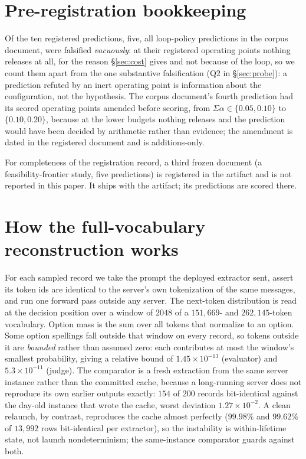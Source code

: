 \documentclass{article}
\newif\ifclaimtags\claimtagsfalse
\newcommand{\ct}[1]{\ifclaimtags\hfill{\scriptsize\textcolor{gray}{[#1]}}\fi}
\begin{document}
\section{Pre-registration bookkeeping}\label{app:prereg}
Of the ten registered predictions, five, all loop-policy predictions in the corpus document, were falsified \emph{vacuously}: at their registered operating points
nothing releases at all, for the reason \S\ref{sec:cost} gives and not because of
the loop, so we count them apart from the one substantive falsification (Q2 in \S\ref{sec:probe}): a prediction refuted by an inert operating point is
information about the configuration, not the hypothesis. The corpus document's fourth prediction had its scored operating points amended before
scoring, from $\Sigma\alpha \in \{0.05, 0.10\}$ to $\{0.10, 0.20\}$, because at
the lower budgets nothing releases and the prediction would have been decided by
arithmetic rather than evidence; the amendment is dated in the registered
document and is additions-only.\ct{C19, C43}

For completeness of the registration record, a third frozen document
(a feasibility-frontier study, five predictions) is registered in the artifact
and is not reported in this paper. It ships with the artifact;
its predictions are scored there.

\section{How the full-vocabulary reconstruction works}\label{app:recon}
For each sampled record we take the prompt the deployed extractor sent, assert
its token ids are identical to the server's own tokenization of the same
messages, and run one forward pass outside any server. The next-token distribution is read at the decision position over a
window of $2048$ of a $151{,}669$- and $262{,}145$-token vocabulary. Option mass
is the sum over all tokens that normalize to an option. Some option spellings
fall outside that window on every record, so tokens outside it are
\emph{bounded} rather than assumed zero: each contributes at most the window's smallest probability, giving
a relative bound of $1.45\times10^{-13}$ (evaluator) and $5.3\times10^{-11}$
(judge). The comparator is a fresh extraction from the same server instance rather than
the committed cache, because a long-running server does not reproduce its own earlier outputs exactly: $154$ of $200$ records bit-identical against the
day-old instance that wrote the cache, worst deviation $1.27\times10^{-2}$. A
clean relaunch, by contrast, reproduces the cache almost perfectly ($99.98\%$
and $99.62\%$ of $13{,}992$ rows bit-identical per extractor), so the
instability is within-lifetime state, not launch nondeterminism; the
same-instance comparator guards against both.\ct{C60, C61, C65, C72, C79, C80}
\end{document}
